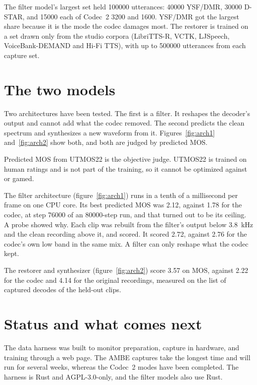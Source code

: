 \documentclass[10pt,twocolumn,a4paper]{article}
\newcommand{\refcodecmos}{1.78}      %
\newcommand{\refcleanmosF}{4.14}     %
\newcommand{\refcodecmosF}{2.22}     %
\newcommand{\refpipemos}{3.57}       %
\begin{document}
The filter model's largest set held \num{100000} utterances:
\num{40000} YSF/DMR, \num{30000} D-STAR, and \num{15000} each of
Codec~2 3200 and 1600. YSF/DMR got the largest share because it is
the mode the codec damages most. The restorer is trained on a set drawn
only from the studio corpora (LibriTTS-R, VCTK, LJSpeech,
VoiceBank-DEMAND and Hi-Fi TTS), with up to \num{500000} utterances
from each capture set.

\section{The two models}
\label{sec:results}

Two architectures have been tested. The first is a filter. It
reshapes the decoder's output and cannot add what the codec removed.
The second predicts the clean spectrum and synthesizes a new waveform
from it. Figures~\ref{fig:arch1} and~\ref{fig:arch2} show both, and
both are judged by predicted MOS.

Predicted MOS from UTMOS22 \cite{saeki2022utmos} is the objective judge. UTMOS22
is trained on human ratings and is not part of the training, so it cannot be
optimized against or gamed.

The filter architecture (figure~\ref{fig:arch1}) runs in a tenth of a millisecond
per frame on one CPU core. Its best predicted MOS was 2.12, against
\refcodecmos{} for the codec, at step \num{76000} of an \num{80000}-step run, and that
turned out to be its ceiling. A probe showed why. Each clip was
rebuilt from the filter's output below \SI{3.8}{kHz} and the clean
recording above it, and scored. It scored 2.72, against 2.76 for the
codec's own low band in the same mix. A filter can only reshape
what the codec kept.

The restorer and synthesizer (figure~\ref{fig:arch2}) score \refpipemos{} on MOS, against
\refcodecmosF{} for the codec and \refcleanmosF{} for the original
recordings, measured on the list of captured decodes of the held-out clips.

\section{Status and what comes next}
\label{sec:status}

The data harness was built to monitor preparation, capture in hardware,
and training through a web page.  The AMBE captures take the longest
time and will run for several weeks, whereas the Codec~2 modes have
been completed.  The harness is Rust and AGPL-3.0-only, and the filter
models also use Rust.
\end{document}

